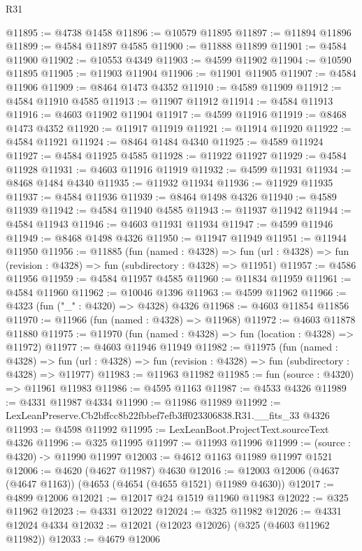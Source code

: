 \begin{lexlean}{R31}
\begin{coremodule}
@11895 := @4738 @1458
@11896 := @10579 @11895
@11897 := @11894 @11896
@11899 := @4584 @11897 @4585
@11900 := @11888 @11899
@11901 := @4584 @11900
@11902 := @10553 @4349
@11903 := @4599 @11902
@11904 := @10590 @11895
@11905 := @11903 @11904
@11906 := @11901 @11905
@11907 := @4584 @11906
@11909 := @8464 @1473 @4352
@11910 := @4589 @11909
@11912 := @4584 @11910 @4585
@11913 := @11907 @11912
@11914 := @4584 @11913
@11916 := @4603 @11902 @11904
@11917 := @4599 @11916
@11919 := @8468 @1473 @4352
@11920 := @11917 @11919
@11921 := @11914 @11920
@11922 := @4584 @11921
@11924 := @8464 @1484 @4340
@11925 := @4589 @11924
@11927 := @4584 @11925 @4585
@11928 := @11922 @11927
@11929 := @4584 @11928
@11931 := @4603 @11916 @11919
@11932 := @4599 @11931
@11934 := @8468 @1484 @4340
@11935 := @11932 @11934
@11936 := @11929 @11935
@11937 := @4584 @11936
@11939 := @8464 @1498 @4326
@11940 := @4589 @11939
@11942 := @4584 @11940 @4585
@11943 := @11937 @11942
@11944 := @4584 @11943
@11946 := @4603 @11931 @11934
@11947 := @4599 @11946
@11949 := @8468 @1498 @4326
@11950 := @11947 @11949
@11951 := @11944 @11950
@11956 := @11885
    (fun (named : @4328) =>
    fun (url : @4328) => fun (revision : @4328) => fun (subdirectory : @4328) => @11951)
@11957 := @4586 @11956
@11959 := @4584 @11957 @4585
@11960 := @11834 @11959
@11961 := @4584 @11960
@11962 := @10046 @1396
@11963 := @4599 @11962
@11966 := @4323 (fun ("_" : @4320) => @4328) @4326
@11968 := @4603 @11854 @11856
@11970 := @11966 (fun (named : @4328) => @11968)
@11972 := @4603 @11878 @11880
@11975 := @11970 (fun (named : @4328) => fun (location : @4328) => @11972)
@11977 := @4603 @11946 @11949
@11982 := @11975
    (fun (named : @4328) =>
    fun (url : @4328) => fun (revision : @4328) => fun (subdirectory : @4328) => @11977)
@11983 := @11963 @11982
@11985 := fun (source : @4320) => @11961 @11983
@11986 := @4595 @1163
@11987 := @4533 @4326
@11989 := @4331 @11987 @4334
@11990 := @11986 @11989
@11992 := LexLeanPreserve.Cb2bffcc8b22fbbef7efb3ff023306838.R31.__fits_33 @4326
@11993 := @4598 @11992
@11995 := LexLeanBoot.ProjectText.sourceText @4326
@11996 := @325 @11995
@11997 := @11993 @11996
@11999 := (source : @4320) -> @11990 @11997
@12003 := @4612 @1163 @11989 @11997 @1521
@12006 := @4620 (@4627 @11987) @4630
@12016 := @12003 @12006 (@4637 (@4647 @1163)) (@4653 (@4654 (@4655 @1521) @11989 @4630))
@12017 := @4899 @12006
@12021 := @12017 @24 @1519 @11960 @11983
@12022 := @325 @11962
@12023 := @4331 @12022
@12024 := @325 @11982
@12026 := @4331 @12024 @4334
@12032 := @12021 (@12023 @12026) (@325 (@4603 @11962 @11982))
@12033 := @4679 @12006

\end{coremodule}
\end{lexlean}
